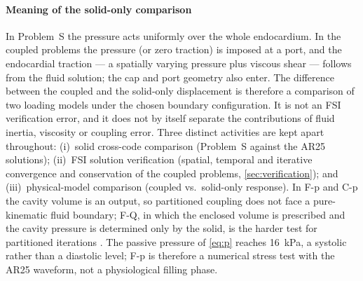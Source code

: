 \paragraph{Meaning of the solid-only comparison}
In Problem~S the pressure acts uniformly over the whole endocardium. In the
coupled problems the pressure (or zero traction) is imposed at a port, and
the endocardial traction --- a spatially varying pressure plus viscous shear
--- follows from the fluid solution; the cap and port geometry also enter.
The difference between the coupled and the solid-only displacement is
therefore a comparison of two loading models under the chosen boundary
configuration. It is not an FSI verification error, and it does not by
itself separate the contributions of fluid inertia, viscosity or coupling
error. Three distinct activities are kept apart throughout:
(i)~solid cross-code comparison (Problem~S against the AR25 solutions);
(ii)~FSI solution verification (spatial, temporal and iterative convergence
and conservation of the coupled problems, \cref{sec:verification}); and
(iii)~physical-model comparison (coupled vs.\ solid-only response).
In F-p and C-p the cavity volume is an output, so partitioned coupling does
not face a pure-kinematic fluid boundary; F-Q, in which the enclosed volume is
prescribed and the cavity pressure is determined only by the solid, is the
harder test for partitioned iterations \citep{Kuttler2006}.
The passive pressure of \cref{eq:p} reaches \SI{16}{kPa}, a systolic rather
than a diastolic level; F-p is therefore a numerical stress test with the
AR25 waveform, not a physiological filling phase.

